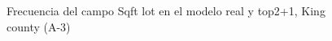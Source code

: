 \begin{figure}[H]
    \centering
    
    \caption{Frecuencia del campo Sqft lot en el modelo real y top2+1, King county (A-3)}
    \label{frecuency-top2+1-sqft lot}
\end{figure}